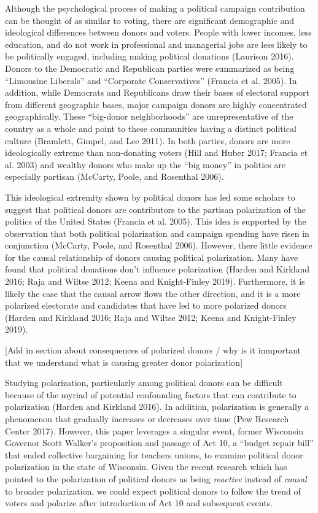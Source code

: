 \documentclass[12pt,]{article}
\begin{document}
Although the psychological process of making a political campaign
contribution can be thought of as similar to voting, there are
significant demographic and ideological differences between donors and
voters. People with lower incomes, less education, and do not work in
professional and managerial jobs are less likely to be politically
engaged, including making political donations (Laurison 2016). Donors to
the Democratic and Republican parties were summarized as being
``Limousine Liberals'' and ``Corporate Conservatives'' (Francia et al.
2005). In addition, while Democrats and Republicans draw their bases of
electoral support from different geographic bases, major campaign donors
are highly concentrated geographically. These ``big-donor
neighborhoods'' are unrepresentative of the country as a whole and point
to these communities having a distinct political culture (Bramlett,
Gimpel, and Lee 2011). In both parties, donors are more ideologically
extreme than non-donating voters (Hill and Huber 2017; Francia et al.
2003) and wealthy donors who make up the ``big money'' in politics are
especially partisan (McCarty, Poole, and Rosenthal 2006).

This ideological extremity shown by political donors has led some
scholars to suggest that political donors are contributors to the
partisan polarization of the politics of the United States (Francia et
al. 2005). This idea is supported by the observation that both political
polarization and campaign spending have risen in conjunction (McCarty,
Poole, and Rosenthal 2006). However, there little evidence for the
causal relationship of donors causing political polarization. Many have
found that political donations don't influence polarization (Harden and
Kirkland 2016; Raja and Wiltse 2012; Keena and Knight-Finley 2019).
Furthermore, it is likely the case that the causal arrow flows the other
direction, and it is a more polarized electorate and candidates that
have led to more polarized donors (Harden and Kirkland 2016; Raja and
Wiltse 2012; Keena and Knight-Finley 2019).

{[}Add in section about consequences of polarized donors / why is it
inmportant that we understand what is causing greater donor
polarization{]}

Studying polarization, particularly among political donors can be
difficult because of the myriad of potential confounding factors that
can contribute to polarization (Harden and Kirkland 2016). In addition,
polarization is generally a phenomenon that gradually increases or
decreases over time (Pew Research Center 2017). However, this paper
leverages a singular event, former Wisconsin Governor Scott Walker's
proposition and passage of Act 10, a ``budget repair bill'' that ended
collective bargaining for teachers unions, to examine political donor
polarization in the state of Wisconsin. Given the recent research which
has pointed to the polarization of political donors as being
\emph{reactive} instead of \emph{causal} to broader polarization, we
could expect political donors to follow the trend of voters and polarize
after introduction of Act 10 and subsequent events.
\end{document}
